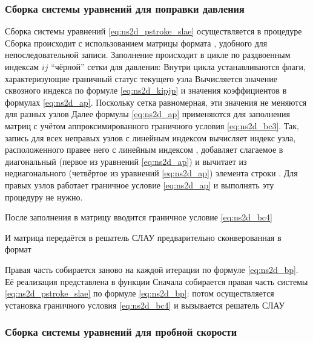 \subsubsection{Сборка системы уравнений для поправки давления}

Сборка системы уравнений \eqref{eq:ns2d_pstroke_slae}
осуществляется в процедуре
Сборка происходит с использованием матрицы формата ,
удобного для непоследовательной записи.
Заполнение происходит в цикле по раздвоенным индексам $ij$
``чёрной'' сетки для давления:
Внутри цикла устанавливаются флаги, характеризующие граничный статус текущего узла
Вычисляется значение сквозного индекса по формуле \eqref{eq:ns2d_kipjp}
и значения коэффициентов в формулах \eqref{eq:ns2d_ap}. Поскольку
сетка равномерная, эти значения не меняются для разных узлов
Далее формулы \eqref{eq:ns2d_ap}
применяются для заполнения матриц
с учётом аппроксимированного граничного условия \eqref{eq:ns2d_bc3}.
Так, запись
для всех неправых узлов с линейным индексом  вычисляет индекс 
узла, расположенного правее него с линейным индексом ,
добавляет слагаемое в диагональный (первое из уравнений \eqref{eq:ns2d_ap}) и
вычитает из недиагонального (четвёртое из уравнений \eqref{eq:ns2d_ap}) элемента
строки .
Для правых узлов работает граничное условие \eqref{eq:ns2d_ap} и выполнять эту процедуру
не нужно.

После заполнения в матрицу вводится граничное условие \eqref{eq:ns2d_bc4}

И матрица передаётся в решатель СЛАУ предварительно сконверованная в формат 

Правая часть собирается заново на каждой итерации по формуле \eqref{eq:ns2d_bp}.
Её реализация представлена в функции
Сначала собирается правая часть системы \eqref{eq:ns2d_pstroke_slae} по формуле \eqref{eq:ns2d_bp}:
потом осуществляется установка граничного условия \eqref{eq:ns2d_bc4}
и вызывается решатель СЛАУ

\subsubsection{Сборка системы уравнений для пробной скорости}

